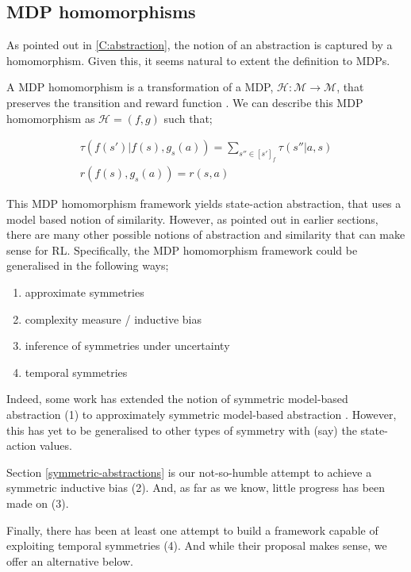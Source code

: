 \subsection{MDP homomorphisms}\label{mdp-homomorphism}

As pointed out in \ref{C:abstraction}, the notion of an abstraction is captured by a homomorphism.
Given this, it seems natural to extent the definition to MDPs.

A MDP homomorphism is a transformation of a MDP, $\mathcal H: \mathcal M\to \mathcal M$, that preserves the transition and reward function \cite{Ravindran2002}. We can describe this MDP homomorphism as $\mathcal H = (f, g)$ such that;

\begin{align*}
\tau(f(s')|f(s), g_s(a)) = \sum_{s''\in [s']_f} \tau(s''| a, s) \\
r(f(s), g_s(a)) = r(s, a)
\end{align*}

This MDP homomorphism framework yields state-action abstraction, that uses a model based notion of similarity.
However, as pointed out in earlier sections, there are many other possible
notions of abstraction and similarity that can make sense for RL. Specifically, the MDP homomorphism framework
could be generalised in the following ways;

\begin{enumerate}
\tightlist
  \item approximate symmetries
  \item complexity measure / inductive bias
  \item inference of symmetries under uncertainty
  \item temporal symmetries
\end{enumerate}

Indeed, some work has extended the notion of symmetric model-based abstraction (1)
to approximately symmetric model-based abstraction \cite{Ravindran2004}. However, this has yet to be generalised to other types of symmetry with (say) the state-action values.

Section \ref{symmetric-abstractions} is our not-so-humble attempt to achieve a symmetric inductive bias (2). And, as far as we know, little progress has been made on (3).

Finally, there has been at least one attempt \cite{Ravindran2003} to build a framework capable of exploiting temporal symmetries (4). And while their proposal makes sense, we offer an alternative below.

